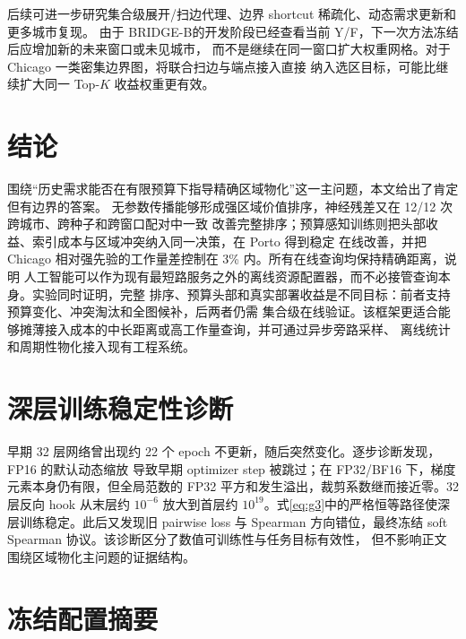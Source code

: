 \documentclass[UTF8,a4paper,10pt,twocolumn]{ctexart}
\newcommand{\bmethod}{BRIDGE-B}
\begin{document}
后续可进一步研究集合级展开/扫边代理、边界 shortcut 稀疏化、动态需求更新和更多城市复现。
由于 \bmethod 的开发阶段已经查看当前 Y/F，下一次方法冻结后应增加新的未来窗口或未见城市，
而不是继续在同一窗口扩大权重网格。对于 Chicago 一类密集边界图，将联合扫边与端点接入直接
纳入选区目标，可能比继续扩大同一 Top-$K$ 收益权重更有效。

\section{结论}

围绕“历史需求能否在有限预算下指导精确区域物化”这一主问题，本文给出了肯定但有边界的答案。
无参数传播能够形成强区域价值排序，神经残差又在 12/12 次跨城市、跨种子和跨窗口配对中一致
改善完整排序；预算感知训练则把头部收益、索引成本与区域冲突纳入同一决策，在 Porto 得到稳定
在线改善，并把 Chicago 相对强先验的工作量差控制在 3\% 内。所有在线查询均保持精确距离，说明
人工智能可以作为现有最短路服务之外的离线资源配置器，而不必接管查询本身。实验同时证明，完整
排序、预算头部和真实部署收益是不同目标：前者支持预算变化、冲突淘汰和全图候补，后两者仍需
集合级在线验证。该框架更适合能够摊薄接入成本的中长距离或高工作量查询，并可通过异步旁路采样、
离线统计和周期性物化接入现有工程系统。

\appendix

\section{深层训练稳定性诊断}

早期 32 层网络曾出现约 22 个 epoch 不更新，随后突然变化。逐步诊断发现，FP16 的默认动态缩放
导致早期 optimizer step 被跳过；在 FP32/BF16 下，梯度元素本身仍有限，但全局范数的 FP32
平方和发生溢出，裁剪系数继而接近零。32 层反向 hook 从末层约 $10^{-6}$ 放大到首层约
$10^{19}$。式\eqref{eq:g3}中的严格恒等路径使深层训练稳定。此后又发现旧 pairwise loss 与
Spearman 方向错位，最终冻结 soft Spearman 协议。该诊断区分了数值可训练性与任务目标有效性，
但不影响正文围绕区域物化主问题的证据结构。

\section{冻结配置摘要}
\end{document}

